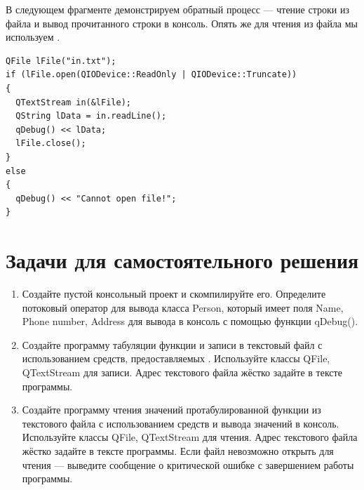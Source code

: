 В следующем фрагменте демонстрируем обратный процесс --- чтение строки из файла и вывод прочитанного строки
в консоль. Опять же для чтения из файла мы
используем .
\begin{lstlisting}
QFile lFile("in.txt");
if (lFile.open(QIODevice::ReadOnly | QIODevice::Truncate))
{
  QTextStream in(&lFile);
  QString lData = in.readLine();
  qDebug() << lData;
  lFile.close();
}
else
{
  qDebug() << "Cannot open file!";
}
\end{lstlisting}


\section{Задачи для самостоятельного решения}
\begin{enumerate}
\item Создайте пустой консольный проект  и скомпилируйте его. Определите потоковый оператор для вывода
класса Person, который имеет поля Name, Phone number, Address для вывода в консоль с помощью функции qDebug(). 
\item Создайте программу табуляции функции и записи в текстовый файл с использованием средств,
предоставляемых . Используйте классы QFile, QTextStream для записи. Адрес текстового файла жёстко задайте в тексте
программы. 
\item Создайте программу чтения значений протабулированной функции из
текстового файла с использованием средств  и вывода значений в консоль. Используйте классы QFile, QTextStream для
чтения. Адрес текстового файла жёстко задайте в тексте программы. Если файл невозможно открыть для чтения --- выведите
сообщение о критической ошибке с завершением работы программы. 
\end{enumerate}
